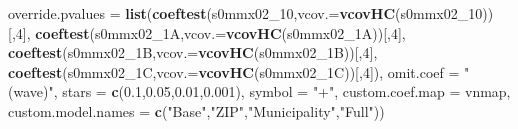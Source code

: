 \documentclass[
]{article}
\newenvironment{Shaded}{\begin{snugshade}}{\end{snugshade}}
\newcommand{\DataTypeTok}[1]{\textcolor[rgb]{0.13,0.29,0.53}{#1}}
\newcommand{\DecValTok}[1]{\textcolor[rgb]{0.00,0.00,0.81}{#1}}
\newcommand{\FloatTok}[1]{\textcolor[rgb]{0.00,0.00,0.81}{#1}}
\newcommand{\KeywordTok}[1]{\textcolor[rgb]{0.13,0.29,0.53}{\textbf{#1}}}
\newcommand{\NormalTok}[1]{#1}
\newcommand{\StringTok}[1]{\textcolor[rgb]{0.31,0.60,0.02}{#1}}
\begin{document}
\begin{Shaded}
\begin{Highlighting}[]
          \DataTypeTok{override.pvalues =} \KeywordTok{list}\NormalTok{(}\KeywordTok{coeftest}\NormalTok{(s0mmx02_}\DecValTok{10}\NormalTok{,}\DataTypeTok{vcov.=}\KeywordTok{vcovHC}\NormalTok{(s0mmx02_}\DecValTok{10}\NormalTok{))[,}\DecValTok{4}\NormalTok{],}
                                  \KeywordTok{coeftest}\NormalTok{(s0mmx02_1A,}\DataTypeTok{vcov.=}\KeywordTok{vcovHC}\NormalTok{(s0mmx02_1A))[,}\DecValTok{4}\NormalTok{],}
                                  \KeywordTok{coeftest}\NormalTok{(s0mmx02_1B,}\DataTypeTok{vcov.=}\KeywordTok{vcovHC}\NormalTok{(s0mmx02_1B))[,}\DecValTok{4}\NormalTok{],}
                                  \KeywordTok{coeftest}\NormalTok{(s0mmx02_1C,}\DataTypeTok{vcov.=}\KeywordTok{vcovHC}\NormalTok{(s0mmx02_1C))[,}\DecValTok{4}\NormalTok{]),}
          \DataTypeTok{omit.coef =} \StringTok{"(wave)"}\NormalTok{, }\DataTypeTok{stars =} \KeywordTok{c}\NormalTok{(}\FloatTok{0.1}\NormalTok{,}\FloatTok{0.05}\NormalTok{,}\FloatTok{0.01}\NormalTok{,}\FloatTok{0.001}\NormalTok{), }\DataTypeTok{symbol =} \StringTok{"+"}\NormalTok{,}
          \DataTypeTok{custom.coef.map =}\NormalTok{ vnmap, }
          \DataTypeTok{custom.model.names =} \KeywordTok{c}\NormalTok{(}\StringTok{"Base"}\NormalTok{,}\StringTok{"ZIP"}\NormalTok{,}\StringTok{"Municipality"}\NormalTok{,}\StringTok{"Full"}\NormalTok{))}
\end{Highlighting}
\end{Shaded}
\end{document}
